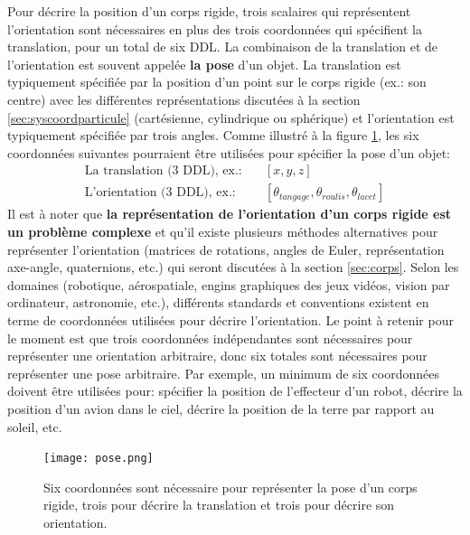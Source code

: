 Pour décrire la position d'un corps rigide, trois scalaires qui représentent l'orientation sont nécessaires en plus des trois coordonnées qui spécifient la translation, pour un total de six DDL. La combinaison de la translation et de l'orientation est souvent appelée \textbf{la pose} d'un objet. La translation est typiquement spécifiée par la position d'un point sur le corps rigide (ex.: son centre) avec les différentes représentations discutées à la section \ref{sec:syscoordparticule} (cartésienne, cylindrique ou sphérique) et l'orientation est typiquement spécifiée par trois angles. Comme illustré à la figure \ref{fig:pose}, les six coordonnées suivantes pourraient être utilisées pour spécifier la pose d'un objet:
\begin{align}
\text{La translation (3 DDL), ex.:} \quad &\left[ x, y, z \right] \\
\text{L'orientation (3 DDL), ex.:} \quad &\left[ \theta_{tangage}, \theta_{roulis}, \theta_{lacet} \right]
\end{align}
Il est à noter que \textbf{la représentation de l'orientation d'un corps rigide est un problème complexe} et qu'il existe plusieurs méthodes alternatives pour représenter l'orientation (matrices de rotations, angles de Euler, représentation axe-angle, quaternions, etc.) qui seront discutées à la section \ref{sec:corps}. Selon les domaines (robotique, aérospatiale, engins graphiques des jeux vidéos, vision par ordinateur, astronomie, etc.), différents standards et conventions existent en terme de coordonnées utilisées pour décrire l'orientation. Le point à retenir pour le moment est que trois coordonnées indépendantes sont nécessaires pour représenter une orientation arbitraire, donc six totales sont nécessaires pour représenter une pose arbitraire. Par exemple, un minimum de six coordonnées doivent être utilisées pour: spécifier la position de l'effecteur d'un robot, décrire la position d'un avion dans le ciel, décrire la position de la terre par rapport au soleil, etc. 

\begin{figure}[htbp]
	\centering
		\texttt{[image: pose.png]}
	\caption{Six coordonnées sont nécessaire pour représenter la pose d'un corps rigide, trois pour décrire la translation et trois pour décrire son orientation.}
	\label{fig:pose}
\end{figure}


